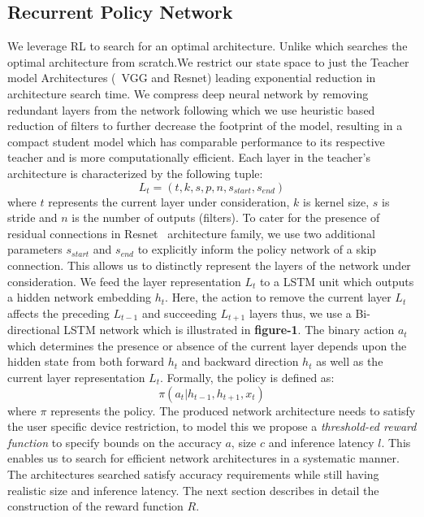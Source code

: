 \documentclass[../main]{subfiles}
\begin{document}
    \subsection{Recurrent Policy Network}
        \label{sec:num2}
        We leverage RL to search for an optimal architecture.
        Unlike \cite{zoph2017learning,tan2018mnasnet,zhou2018resource} which searches the optimal architecture from scratch.We restrict our state space to just the Teacher model Architectures (\viz~VGG and Resnet) leading exponential reduction in architecture search time.
        We compress deep neural network by removing redundant layers from the network following which we use heuristic based reduction of filters \cite{molchanov2016pruning} to further decrease the footprint of the model, resulting in a compact student model which has comparable performance to its respective teacher and is more computationally efficient.
        Each layer in the teacher’s architecture is characterized by the following tuple: 
        \begin{equation}
             L_{t} = (t, k, s, p, n, s_{start}, s_{end})
         \end{equation}
        where $t$ represents the current layer under consideration, $k$ is kernel size, $s$ is stride and $n$ is the number of outputs (filters).
        To cater for the presence of residual connections in Resnet~\cite{he2015deep} architecture family, we use two additional parameters $s_{start}$ and $s_{end}$ to explicitly inform the policy network of a skip connection.
        This allows us to distinctly represent the layers of the network under consideration.
        We feed the layer representation $L_{t}$ to a LSTM unit which outputs a hidden network embedding $h_{t}$.
        Here, the action to remove the current layer $L_{t}$ affects the preceding  $L_{t-1}$ and succeeding  $L_{t+1}$ layers thus, we use a Bi-directional LSTM network which is illustrated in \textbf{figure-1}.
        The binary action $a_{t}$ which determines the presence or absence of the current layer depends upon the hidden state from both forward $h_{t}$ and backward direction $h_{t}$ as well as the current layer representation $L_{t}$.
        Formally, the policy is defined as:
        \begin{equation}
                \pi(a_{t}|h_{t-1}, h_{t+1}, x_{t})
        \end{equation}
        where $\pi$ represents the policy.
        The produced network architecture needs to satisfy the user specific device restriction, to model this we propose a \textit{threshold-ed reward function} to specify bounds on the accuracy $a$, size $c$ and inference latency $l$.
        This enables us to search for efficient network architectures in a systematic manner.
        The architectures searched satisfy accuracy requirements while still having realistic size and inference latency.
        The next section describes in detail the construction of the reward function $R$.
\end{document}
